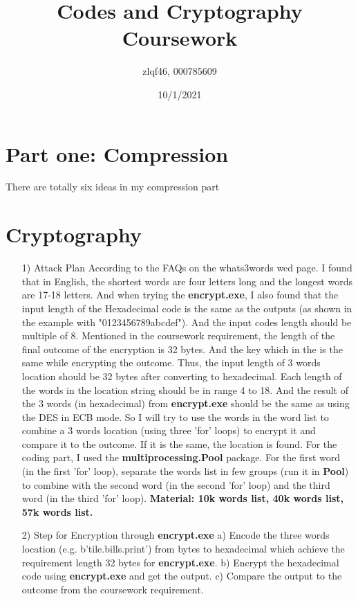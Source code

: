 \documentclass[11pt, a4paper, margin 2cm]{report}
\title{\textbf{Codes and Cryptography Coursework}}
\author{zlqf46, 000785609}
\date{10/1/2021}
\begin{document}
\maketitle
\section[1]{\Large Part one: Compression}
\normalsize\indent\setlength{\parindent}{2em}There are totally six ideas in my compression part

\newpage
\Large\section[2]{Cryptography}

\begin{enumerate}
\normalsize\item[1)]{Attack Plan}
\newline\normalsize\indent\setlength{\parindent}{2em}According to the FAQs on the whats3words wed page. I found that in English, the shortest words are four letters long and the longest words are 17-18 letters. And when trying the \textbf{encrypt.exe}, I also found that the input length of the Hexadecimal code is the same as the outputs (as shown in the example with "0123456789abcdef"). And the input codes length should be multiple of 8. \newline Mentioned in the coursework requirement, the length of the final outcome of the encryption is 32 bytes. And the key which in the  is the same while encrypting the outcome. \newline Thus, the input length of 3 words location should be 32 bytes after converting to hexadecimal. Each length of the words in the location string should be in range 4 to 18. And the result of the 3 words (in hexadecimal) from \textbf{encrypt.exe} should be the same as using the DES in ECB mode. So I will try to use the words in the word list to combine a 3 words location (using three 'for' loops) to encrypt it and compare it to the outcome. If it is the same, the location is found. For the coding part, I used the \textbf{multiprocessing.Pool} package. For the first word (in the first 'for' loop), separate the words list in few groups (run it in \textbf{Pool}) to combine with the second word (in the second 'for' loop)  and the third word (in the third 'for' loop). \newline\textbf{Material: 10k words list, 40k words list, 57k words list.}

\normalsize\item[2)]{Step for Encryption through \textbf{encrypt.exe}}
\newline\normalsize\indent\setlength{\parindent}{2em}a) Encode the three words location (e.g. b'tile.bills.print') from bytes to hexadecimal which achieve the requirement length 32 bytes for \textbf{encrypt.exe}. \newline\indent\setlength{\parindent}{2em}b) Encrypt the hexadecimal code using \textbf{encrypt.exe} and get the output. \newline\indent\setlength{\parindent}{2em}c) Compare the output to the outcome from the coursework requirement.


\end{enumerate}
\end{document}
